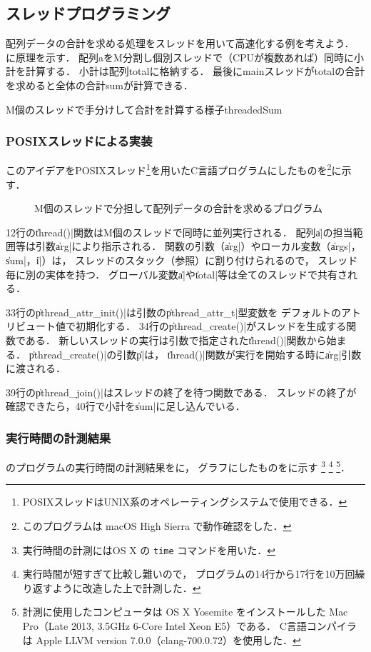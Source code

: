 \subsection{スレッドプログラミング}
配列データの合計を求める処理をスレッドを用いて高速化する例を考えよう．
に原理を示す．
配列aをM分割し個別スレッドで（CPUが複数あれば）同時に小計を計算する．
小計は配列totalに格納する．
最後にmainスレッドがtotalの合計を求めると全体の合計sumが計算できる．

{M個のスレッドで手分けして合計を計算する様子}{threadedSum}

\subsubsection{POSIXスレッドによる実装}
このアイデアをPOSIXスレッド\footnote{
POSIXスレッドはUNIX系のオペレーティングシステムで使用できる．
}を用いたC言語プログラムにしたものを\footnote{
このプログラムは macOS High Sierra で動作確認をした．
}に示す．

\begin{figure}[btp]

\caption{M個のスレッドで分担して配列データの合計を求めるプログラム}
\label{fig:threadTest}
\end{figure}

12行の\|thread()|関数はM個のスレッドで同時に並列実行される．
配列\|a|の担当範囲等は引数\|arg|により指示される．
関数の引数（\|arg|）やローカル変数（\|args|，\|sum|，\|i|）は，
スレッドのスタック（参照）に割り付けられるので，
スレッド毎に別の実体を持つ．
グローバル変数\|a|や\|total|等は全てのスレッドで共有される．

33行の\|pthread_attr_init()|は引数の\|pthread_attr_t|型変数を
デフォルトのアトリビュート値で初期化する．
34行の\|pthread_create()|がスレッドを生成する関数である．
新しいスレッドの実行は引数で指定された\|thread()|関数から始まる．
\|pthread_create()|の引数\|p|は，
\|thread()|関数が実行を開始する時に\|arg|引数に渡される．

39行の\|pthread_join()|はスレッドの終了を待つ関数である．
スレッドの終了が確認できたら，40行で小計を\|sum|に足し込んでいる．

\subsubsection{実行時間の計測結果}
のプログラムの実行時間の計測結果をに，
グラフにしたものをに示す
\footnote{
実行時間の計測にはOS X の {\tt time} コマンドを用いた．
}
\footnote{
実行時間が短すぎて比較し難いので，
プログラムの14行から17行を10万回繰り返すように改造した上で計測した．}
\footnote{
計測に使用したコンピュータは
OS X Yosemite をインストールした
Mac Pro（Late 2013, 3.5GHz 6-Core Intel Xeon E5）である．
C言語コンパイラは
Apple LLVM version 7.0.0（clang-700.0.72）を使用した．
}．

